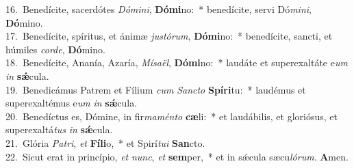 {16.~}Benedícite, sacerdótes \textit{Dó}\textit{mi}\textit{ni}, \textbf{Dó}\textbf{mi}no:~* benedícite, servi Dó\textit{mi}\textit{ni}, \textbf{Dó}mino.\\
{17.~}Benedícite, spíritus, et ánimæ \textit{ju}\textit{stó}\textit{rum}, \textbf{Dó}\textbf{mi}no:~* benedícite, sancti, et húmiles \textit{cor}\textit{de}, \textbf{Dó}mino.\\
{18.~}Benedícite, Ananía, Azaría, \textit{Mí}\textit{sa}\textit{ël}, \textbf{Dó}\textbf{mi}no:~* laudáte et superexaltáte e\textit{um} \textit{in} \textbf{sǽ}cula.\\
{19.~}Benedicámus Patrem et Fílium \textit{cum} \textit{San}\textit{cto} \textbf{Spí}\textbf{ri}tu:~* laudémus et superexaltémus e\textit{um} \textit{in} \textbf{sǽ}cula.\\
{20.~}Benedíctus es, Dómine, in fir\textit{ma}\textit{mén}\textit{to} \textbf{cæ}li:~* et laudábilis, et gloriósus, et superexaltá\textit{tus} \textit{in} \textbf{sǽ}cula.\\
{21.~}Glória \textit{Pa}\textit{tri}, \textit{et} \textbf{Fí}\textbf{li}o,~* et Spirí\textit{tu}\textit{i} \textbf{San}cto.\\
{22.~}Sicut erat in princípio, \textit{et} \textit{nunc}, \textit{et} \textbf{sem}per,~* et in sǽcula sæcu\textit{ló}\textit{rum}. \textbf{A}men.\\
